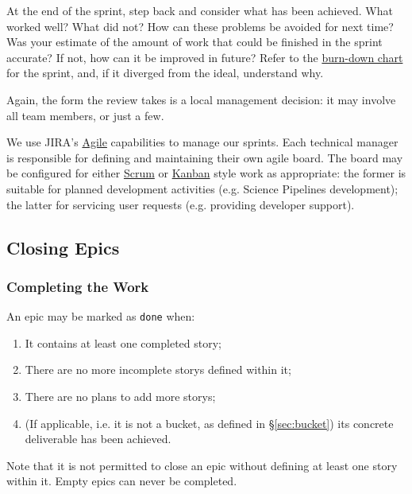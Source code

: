 \begin{enumerate}
  At the end of the sprint, step back and consider what has been
  achieved. What worked well? What did not? How can these problems be
  avoided for next time? Was your estimate of the amount of work that
  could be finished in the sprint accurate? If not, how can it be
  improved in future? Refer to the
  \href{https://en.wikipedia.org/wiki/Burn_down_chart}{burn-down chart}
  for the sprint, and, if it diverged from the ideal, understand why.

  Again, the form the review takes is a local management decision: it
  may involve all team members, or just a few.
\end{enumerate}

We use \gls{JIRA}'s
\href{https://www.atlassian.com/software/jira/agile}{Agile} capabilities
to manage our sprints. Each technical manager is responsible for
defining and maintaining their own agile board. The board may be
configured for either
\href{https://en.wikipedia.org/wiki/Scrum_(software_development)}{Scrum}
or \href{https://en.wikipedia.org/wiki/Kanban_(development)}{Kanban}
style work as appropriate: the former is suitable for planned
development activities (e.g. \gls{Science Pipelines} development); the latter
for servicing user requests (e.g. providing developer support).

\subsection{Closing Epics}
\label{sec:epic-close}

\subsubsection{Completing the Work}
\label{sec:epic-done}

An \gls{epic} may be marked as \texttt{done} when:

\begin{enumerate}
\item It contains at least one completed \gls{story};
\item There are no more incomplete \glspl{story} defined within it;
\item There are no plans to add more \glspl{story};
\item (If applicable, i.e. it is not a bucket, as defined in \S\ref{sec:bucket}) its concrete deliverable has been achieved.
\end{enumerate}

Note that it is not permitted to close an \gls{epic} without defining at least one \gls{story} within it.
Empty \glspl{epic} can never be completed.

